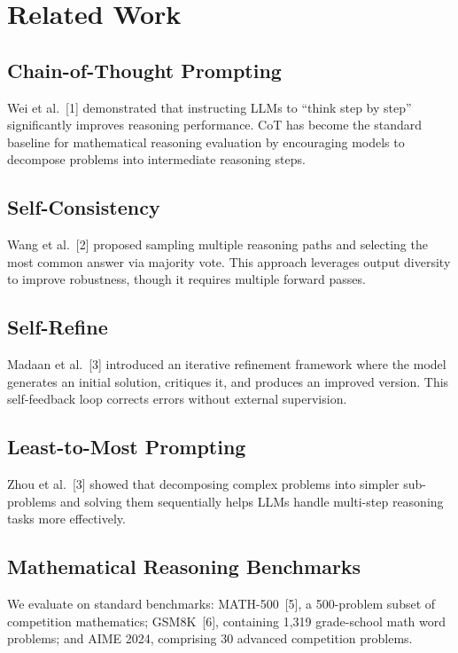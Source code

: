 \documentclass[conference]{IEEEtran}
\begin{document}
\section{Related Work}

\subsection{Chain-of-Thought Prompting}
Wei et al.~[1] demonstrated that instructing LLMs to ``think step by step'' significantly improves reasoning performance. CoT has become the standard baseline for mathematical reasoning evaluation by encouraging models to decompose problems into intermediate reasoning steps.

\subsection{Self-Consistency}
Wang et al.~[2] proposed sampling multiple reasoning paths and selecting the most common answer via majority vote. This approach leverages output diversity to improve robustness, though it requires multiple forward passes.

\subsection{Self-Refine}
Madaan et al.~[3] introduced an iterative refinement framework where the model generates an initial solution, critiques it, and produces an improved version. This self-feedback loop corrects errors without external supervision.

\subsection{Least-to-Most Prompting}
Zhou et al.~[3] showed that decomposing complex problems into simpler sub-problems and solving them sequentially helps LLMs handle multi-step reasoning tasks more effectively.

\subsection{Mathematical Reasoning Benchmarks}
We evaluate on standard benchmarks: MATH-500~[5], a 500-problem subset of competition mathematics; GSM8K~[6], containing 1,319 grade-school math word problems; and AIME 2024, comprising 30 advanced competition problems.
\end{document}
